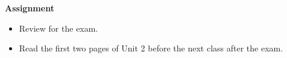


\noindent
{\bf Assignment}
\begin{itemize}
\item Review for the exam.
\item Read  the first two pages of Unit 2 before the next class
  after the exam.  
\end{itemize}

